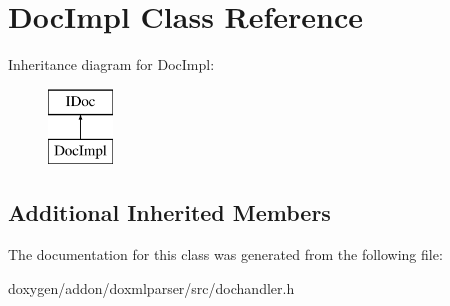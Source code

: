 \hypertarget{class_doc_impl}{}\section{Doc\+Impl Class Reference}
\label{class_doc_impl}
Inheritance diagram for Doc\+Impl\+:\begin{figure}[H]
\begin{center}
\leavevmode
\includegraphics[height=2.000000cm]{class_doc_impl}
\end{center}
\end{figure}
\subsection*{Additional Inherited Members}


The documentation for this class was generated from the following file\+:\begin{DoxyCompactItemize}
\item 
doxygen/addon/doxmlparser/src/dochandler.\+h\end{DoxyCompactItemize}

